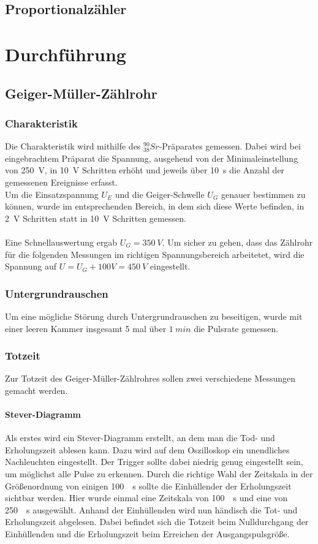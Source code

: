 \documentclass[12pt,a4paper]{article}
\begin{document}
\subsection{Proportionalzähler}

\section{Durchführung}
\subsection{Geiger-Müller-Zählrohr}
\subsubsection{Charakteristik}
Die Charakteristik wird mithilfe des $_{38}^{90}Sr$-Präparates gemessen. Dabei wird bei eingebrachtem Präparat die Spannung, ausgehend von der Minimaleinstellung von \SI{250}{V}, in \SI{10}{V} Schritten erhöht und jeweils über \SI{10}{s} die Anzahl der gemessenen Ereignisse erfasst.\\
Um die Einsatzspannung $U_E$ und die Geiger-Schwelle $U_G$ genauer bestimmen zu können, wurde im entsprechenden Bereich, in dem sich diese Werte befinden, in \SI{2}{V} Schritten statt in \SI{10}{V} Schritten gemessen.\\
\\Eine Schnellauswertung ergab $U_G = \SI{350}{V}$. Um sicher zu gehen, dass das Zählrohr für die folgenden Messungen im richtigen Spannungsbereich arbeitetet, wird die Spannung auf $U = U_G + 100V = \SI{450}{V}$ eingestellt.

\subsubsection{Untergrundrauschen}
Um eine mögliche Störung durch Untergrundrauschen zu beseitigen, wurde mit einer leeren Kammer insgesamt 5 mal über $\SI{1}{min}$ die Pulsrate gemessen.

\subsubsection{Totzeit}
Zur Totzeit des Geiger-Müller-Zählrohres sollen zwei verschiedene Messungen gemacht werden.
\paragraph{Stever-Diagramm}
Als erstes wird ein Stever-Diagramm erstellt, an dem man die Tod- und Erholungszeit ablesen kann. Dazu wird auf dem Oszilloskop ein unendliches Nachleuchten eingestellt. Der Trigger sollte dabei niedrig genug eingestellt sein, um möglichst alle Pulse zu erkennen. Durch die richtige Wahl der Zeitskala in der Größenordnung von einigen \SI{100}{\mu s} sollte die Einhüllender der Erholungszeit sichtbar werden. Hier wurde einmal eine Zeitskala von \SI{100}{\mu s} und eine von \SI{250}{\mu s} ausgewählt. Anhand der Einhüllenden wird nun händisch die Tot- und Erholungszeit abgelesen. Dabei befindet sich die Totzeit beim Nulldurchgang der Einhüllenden und die Erholungszeit beim Erreichen der Ausgangspulsgröße. 
\end{document}
